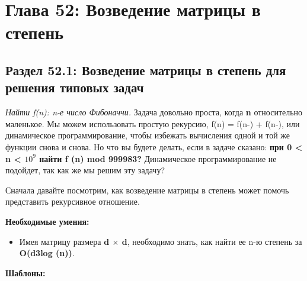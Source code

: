 \chapter*{Глава 52: Возведение матрицы в степень}
\section*{Раздел 52.1: Возведение матрицы в степень для решения типовых задач}

\textit{Найти f(n): n-е число Фибоначчи.} Задача довольно проста, когда \textbf{n} относительно маленькое. Мы можем использовать простую рекурсию, f(n) = f(n-) + f(n-), или динамическое программирование, чтобы избежать вычисления одной и той же функции снова и снова. Но что вы будете делать, если в задаче сказано: \textbf{при 0 < n < $10^9$ найти f (n) mod 999983?} Динамическое программирование не подойдет, так как же мы решим эту задачу?
\vspace{\baselineskip}

Сначала давайте посмотрим, как возведение матрицы в степень может помочь представить рекурсивное отношение.
\vspace{\baselineskip}

\textbf{Необходимые умения:}
\begin{itemize}
     две матрицы, необходимо знать, как найти их произведение. Далее, имея матрицу, полученную путем перемножения этих двух матриц, и одну из этих матриц, необходимо знать, как найти другую матрицу.
    \item Имея матрицу размера \textbf{d $\times$ d}, необходимо знать, как найти ее n-ю степень за \textbf{O(d3log (n))}.
\end{itemize}
\textbf{Шаблоны:}

